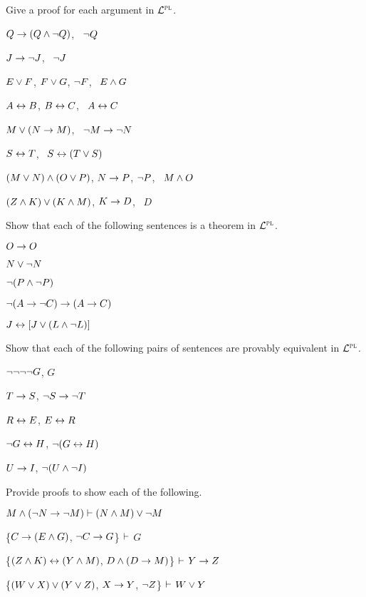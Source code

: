 \problempart
Give a proof for each argument in $\mathcal{L}^{\textsc{pl}}$.
\begin{earg}
\item $Q\rightarrow(Q\wedge\neg Q)$, \therefore\ $\neg Q$
\item $J\rightarrow\neg J$, \therefore\ $\neg J$
\item $E\vee F$, $F\vee G$, $\neg F$, \therefore\ $E \wedge G$
\item $A\leftrightarrow B$, $B\leftrightarrow C$, \therefore\ $A\leftrightarrow C$
\item $M\vee(N\rightarrow M)$, \therefore\ $\neg M \rightarrow \neg N$
\item $S\leftrightarrow T$, \therefore\ $S\leftrightarrow (T\vee S)$
\item $(M \vee N) \wedge (O \vee P)$, $N \rightarrow P$, $\neg P$, \therefore\ $M\wedge O$
\item $(Z\wedge K) \vee (K\wedge M)$, $K \rightarrow D$, \therefore\ $D$
\end{earg}


\solutions
\problempart
\label{pr.PLND.theorems}
Show that each of the following sentences is a theorem in $\mathcal{L}^{\textsc{pl}}$.
\begin{earg}
\item $O \rightarrow O$
\item $N \vee \neg N$
\item $\neg(P\wedge \neg P)$
\item $\neg(A \rightarrow \neg C) \rightarrow (A \rightarrow C)$
\item $J \leftrightarrow [J\vee (L\wedge\neg L)]$
\end{earg}

\problempart
Show that each of the following pairs of sentences are provably equivalent in $\mathcal{L}^{\textsc{pl}}$.
\begin{earg}
\item $\neg\neg\neg\neg G$, $G$
\item $T\rightarrow S$, $\neg S \rightarrow \neg T$
\item $R \leftrightarrow E$, $E \leftrightarrow R$
\item $\neg G \leftrightarrow H$, $\neg(G \leftrightarrow H)$
\item $U \rightarrow I$, $\neg(U \wedge \neg I)$
\end{earg}

\solutions
\problempart
\label{pr.solvedPLproofs2}
Provide proofs to show each of the following.
\begin{earg}
\item $M \wedge (\neg N \rightarrow \neg M) \vdash (N \wedge M) \vee \neg M$
\item \{$C\rightarrow(E\wedge G)$, $\neg C \rightarrow G$\} $\vdash$ $G$
\item \{$(Z\wedge K)\leftrightarrow(Y\wedge M)$, $D\wedge(D\rightarrow M)$\} $\vdash$ $Y\rightarrow Z$
\item \{$(W \vee X) \vee (Y \vee Z)$, $X\rightarrow Y$, $\neg Z$\} $\vdash$ $W\vee Y$
\end{earg}



